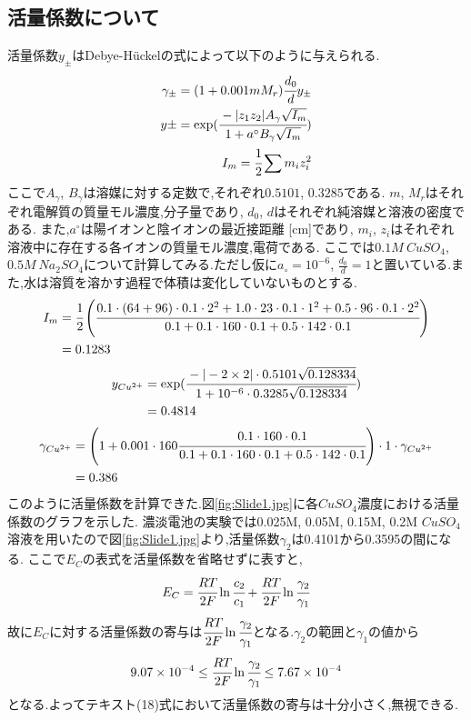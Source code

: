\subsection{活量係数について}
活量係数$y_{\pm}$はDebye-H\"{u}ckelの式によって以下のように与えられる\cite{kiso}.
\begin{align}
  \label{debye}
  \gamma_{\pm}=(1+0.001mM_r)\cfrac{d_0}{d}y_{\pm}\\
  y{\pm}=\exp(\cfrac{-|z_1z_2|A_{\gamma}\sqrt{I_m}}{1+a^{\circ}B_{\gamma}\sqrt{I_m}})\\
  I_m=\cfrac{1}{2}\sum m_iz_i^2
\end{align}
ここで$A_{\gamma}$, $B_{\gamma}$は溶媒に対する定数で,それぞれ$0.5101$, $0.3285$である.
$m$, $M_r$はそれぞれ電解質の質量モル濃度,分子量であり, $d_0$, $d$はそれぞれ純溶媒と溶液の密度である.
また,$a^{\circ}$は陽イオンと陰イオンの最近接距離 [cm]であり, $m_i$, $z_i$はそれぞれ溶液中に存在する各イオンの質量モル濃度,電荷である.
ここでは$0.1M\ CuSO_4$, $0.5M\ Na_2SO_4$について計算してみる.ただし仮に$a_{\circ}=10^{-6}$, $\tfrac{d_0}{d}=1$と置いている.また,水は溶質を溶かす過程で体積は変化していないものとする.
\begin{align*}
  I_m&=\cfrac{1}{2}\left(\cfrac{0.1\cdot\left(64+96\right)\cdot0.1\cdot2^2+1.0\cdot23\cdot0.1\cdot1^2+0.5\cdot96\cdot0.1\cdot2^2}{0.1+0.1\cdot160\cdot0.1+0.5\cdot142\cdot0.1}\right)\\
  &=0.1283
\end{align*}
\begin{align*}
  y_{Cu^{2+}}&=\exp(\cfrac{-|-2\times2|\cdot0.5101\sqrt{0.128334}}{1+10^{-6}\cdot0.3285\sqrt{0.128334}})\\
  &=0.4814
\end{align*}
\begin{align*}
  \gamma_{Cu^{2+}}&=\left(1+0.001\cdot160\cfrac{0.1\cdot160\cdot0.1}{0.1+0.1\cdot160\cdot0.1+0.5\cdot142\cdot0.1}\right)\cdot1\cdot\gamma_{Cu^{2+}}\\
  &=0.386
\end{align*}
このように活量係数を計算できた.図\ref{fig:Slide1.jpg}に各$CuSO_4$濃度における活量係数のグラフを示した.
濃淡電池の実験では0.025M, 0.05M, 0.15M, 0.2M $CuSO_4$溶液を用いたので図\ref{fig:Slide1.jpg}より,活量係数$\gamma_2$は0.4101から0.3595の間になる.
ここで$E_C$の表式を活量係数を省略せずに表すと,
\begin{equation}
  \label{equ:E_Ckaturyo}
  E_C=\cfrac{RT}{2F}\ln \cfrac{c_2}{c_1} + \cfrac{RT}{2F}\ln \cfrac{\gamma_2}{\gamma_1}
\end{equation}
故に$E_C$に対する活量係数の寄与は$\cfrac{RT}{2F}\ln \cfrac{\gamma_2}{\gamma_1}$となる.$\gamma_2$の範囲と$\gamma_1$の値から
\begin{equation*}
  9.07\times10^{-4} \leq \cfrac{RT}{2F}\ln \cfrac{\gamma_2}{\gamma_1} \leq 7.67\times10^{-4}
\end{equation*}
となる.よってテキスト(18)式において活量係数の寄与は十分小さく,無視できる.

